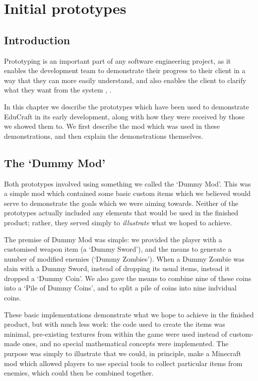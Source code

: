 \chapter{Initial prototypes}

\section{Introduction}
Prototyping is an important part of any software engineering project,
as it enables the development team to demonstrate their progress to
their client in a way that they can more easily understand, and also
enables the client to clarify what they want from the system
\cite{brooks87}, \cite{sommerville11}.

In this chapter we describe the prototypes which have been used to
demonstrate EduCraft in its early development, along with how they were
received by those we showed them to. We first describe the mod which
was used in these demonstrations, and then explain the demonstrations
themselves.

\section{The `Dummy Mod'}
Both prototypes involved using something we called the `Dummy Mod'.
This was a simple mod which contained some basic custom items
which we believed would serve to demonstrate the goals which we were
aiming towards. Neither of the prototypes actually included any
elements that would be used in the finished product; rather, they served
simply to \textit{illustrate} what we hoped to achieve.

The premise of Dummy Mod was simple: we provided the player with a
customised weapon item (a `Dummy Sword'), and the means to generate a
number of modified enemies (`Dummy Zombies'). When a Dummy Zombie was
slain with a Dummy Sword, instead of dropping its usual items, instead it 
dropped a `Dummy Coin'. We also gave the means to combine nine of these coins 
into a `Pile of Dummy Coins', and to split a pile of coins into nine indvidual 
coins.

These basic implementations demonstrate what we hope to achieve in the
finished product, but with much less work: the code used to create the
items was minimal, pre-existing textures from within the game were
used instead of custom-made ones, and no special mathematical concepts
were implemented. The purpose was simply to illustrate that we could,
in principle, make a Minecraft mod which allowed players to use special
tools to collect particular items from enemies, which could then be
combined together.

